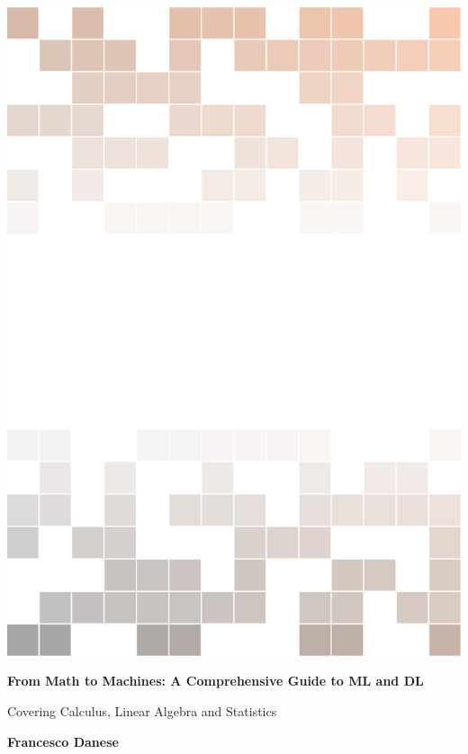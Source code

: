 \documentclass[
	11pt, %
	fleqn, %
	a4paper, %
]{LegrandOrangeBook}
\begin{document}

\titlepage %
{\includegraphics[width=\paperwidth]{background.pdf}} %
{ %
	\centering\sffamily %
	{\Huge\bfseries From Math to Machines: A Comprehensive Guide to ML and DL \par} %
	\vspace{16pt} %
	{\LARGE Covering Calculus, Linear Algebra and Statistics\par} %
	\vspace{24pt} %
	{\huge\bfseries Francesco Danese \par} %
}
\end{document}
